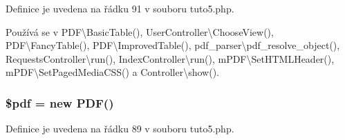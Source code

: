 Definice je uvedena na řádku 91 v souboru tuto5.\-php.



Používá se v P\-D\-F\textbackslash{}\-Basic\-Table(), User\-Controller\textbackslash{}\-Choose\-View(), P\-D\-F\textbackslash{}\-Fancy\-Table(), P\-D\-F\textbackslash{}\-Improved\-Table(), pdf\-\_\-parser\textbackslash{}pdf\-\_\-resolve\-\_\-object(), Requests\-Controller\textbackslash{}run(), Index\-Controller\textbackslash{}run(), m\-P\-D\-F\textbackslash{}\-Set\-H\-T\-M\-L\-Header(), m\-P\-D\-F\textbackslash{}\-Set\-Paged\-Media\-C\-S\-S() a Controller\textbackslash{}show().

\hypertarget{tuto5_8php_a964ee5ee597c515cbb4dad2f14054cb4}{
\subsubsection[{\$pdf}]{\setlength{\rightskip}{0pt plus 5cm}\$pdf = new {\bf P\-D\-F}()}}\label{tuto5_8php_a964ee5ee597c515cbb4dad2f14054cb4}


Definice je uvedena na řádku 89 v souboru tuto5.\-php.

